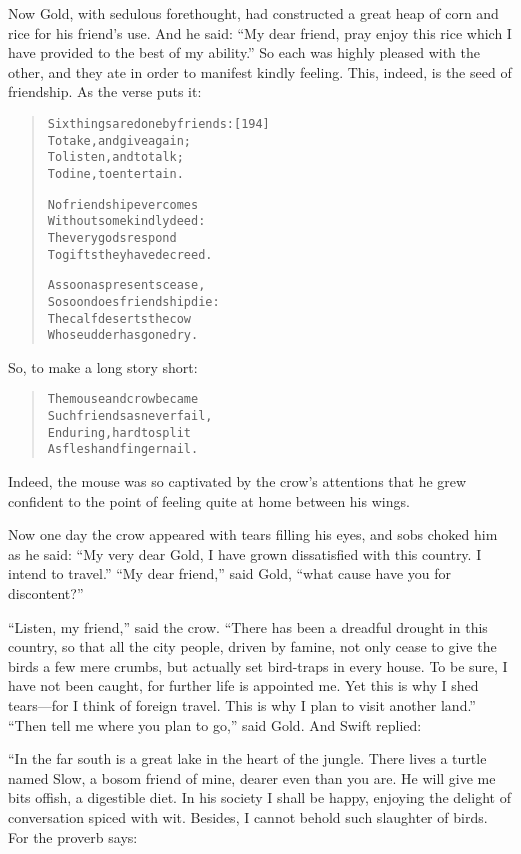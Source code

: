 \documentclass[article, twoside, 14pt]{memoir}
\renewenvironment{verbatim}{%
\begin{quote}%
\vskip -10pt%
\begin{alltt}\normalfont\large}{\end{alltt}%
\end{quote}%
\vskip -10pt
} %
\begin{document}
Now Gold, with sedulous forethought, had constructed a great heap
of corn and rice for his friend's use. And he said:
``My dear friend, pray enjoy this rice which I have provided to the best of my ability.''
So each was highly pleased with the other, and they ate in order to
manifest kindly feeling. This, indeed, is the seed of friendship.
As the verse puts it:

\begin{verbatim}
Six things are done by friends:                         [194]
    To take, and give again;
To listen, and to talk;
    To dine, to entertain.

No friendship ever comes
    Without some kindly deed:
The very gods respond
    To gifts they have decreed.

As soon as presents cease,
    So soon does friendship die:
The calf deserts the cow
    Whose udder has gone dry.
\end{verbatim}
So, to make a long story short:

\begin{verbatim}
The mouse and crow became
    Such friends as never fail,
Enduring, hard to split
    As flesh and finger nail.
\end{verbatim}
Indeed, the mouse was so captivated by the crow's attentions that
he grew confident to the point of feeling quite at home between his
wings.

Now one day the crow appeared with tears filling his eyes, and sobs
choked him as he said:
``My very dear Gold, I have grown dissatisfied with this country. I intend to travel.''
``My dear friend,'' said Gold,
``what cause have you for discontent?''

``Listen, my friend,'' said the crow.
``There has been a dreadful drought in this country, so that all the city people, driven by famine, not only cease to give the birds a few mere crumbs, but actually set bird-traps in every house. To be sure, I have not been caught, for further life is appointed me. Yet this is why I shed tears---for I think of foreign travel. This is why I plan to visit another land.''
``Then tell me where you plan to go,'' said Gold. And Swift
replied:

“In the far south is a great lake in the heart of the jungle. There
lives a turtle named Slow, a bosom friend of mine, dearer even than
you are. He will give me bits offish, a digestible diet. In his
society I shall be happy, enjoying the delight of conversation
spiced with wit. Besides, I cannot behold such slaughter of birds.
For the proverb says:
\end{document}
